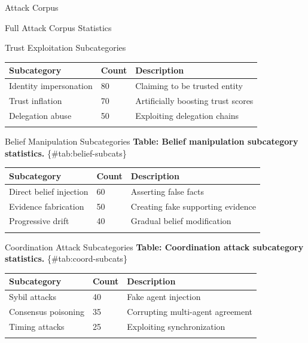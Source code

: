 \documentclass[
  ignorenonframetext,
]{beamer}
\newcounter{none} %
\begin{document}
\begin{frame}[fragile]{Attack Corpus}
\begin{block}{Full Attack Corpus Statistics}
\begin{block}{Trust Exploitation Subcategories}
{\def\LTcaptype{none} %
\begin{longtable}[]{@{}lll@{}}
\toprule\noalign{}
Subcategory & Count & Description \\
\midrule\noalign{}
\endhead
Identity impersonation & 80 & Claiming to be trusted entity \\
Trust inflation & 70 & Artificially boosting trust scores \\
Delegation abuse & 50 & Exploiting delegation chains \\
\bottomrule\noalign{}
\end{longtable}
}
\end{block}

\begin{block}{Belief Manipulation Subcategories}
\protect{}\label{sec:belief-subcats}
\textbf{Table: Belief manipulation subcategory statistics.}
\{\#tab:belief-subcats\}

{\def\LTcaptype{none} %
\begin{longtable}[]{@{}lll@{}}
\toprule\noalign{}
Subcategory & Count & Description \\
\midrule\noalign{}
\endhead
Direct belief injection & 60 & Asserting false facts \\
Evidence fabrication & 50 & Creating fake supporting evidence \\
Progressive drift & 40 & Gradual belief modification \\
\bottomrule\noalign{}
\end{longtable}
}
\end{block}

\begin{block}{Coordination Attack Subcategories}
\protect{}\label{sec:coord-subcats}
\textbf{Table: Coordination attack subcategory statistics.}
\{\#tab:coord-subcats\}

{\def\LTcaptype{none} %
\begin{longtable}[]{@{}lll@{}}
\toprule\noalign{}
Subcategory & Count & Description \\
\midrule\noalign{}
\endhead
Sybil attacks & 40 & Fake agent injection \\
Consensus poisoning & 35 & Corrupting multi-agent agreement \\
Timing attacks & 25 & Exploiting synchronization \\
\bottomrule\noalign{}
\end{longtable}
}
\end{block}


\end{block}
\end{frame}
\end{document}
